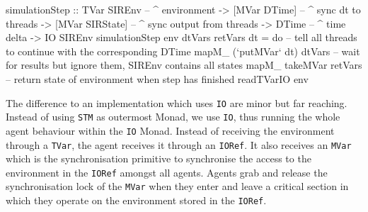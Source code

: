 \begin{HaskellCode}
simulationStep :: TVar SIREnv     -- ^ environment 
               -> [MVar DTime]    -- ^ sync dt to threads
               -> [MVar SIRState] -- ^ sync output from threads
               -> DTime           -- ^ time delta
               -> IO SIREnv
simulationStep env dtVars retVars dt = do
  -- tell all threads to continue with the corresponding DTime
  mapM_ (`putMVar` dt) dtVars
  -- wait for results but ignore them, SIREnv contains all states
  mapM_ takeMVar retVars
  -- return state of environment when step has finished
  readTVarIO env
\end{HaskellCode}

The difference to an implementation which uses \texttt{IO} are minor but far reaching. Instead of using \texttt{STM} as outermost Monad, we use \texttt{IO}, thus running the whole agent behaviour within the \texttt{IO} Monad. Instead of receiving the environment through a \texttt{TVar}, the agent receives it through an \texttt{IORef}. It also receives an \texttt{MVar} which is the synchronisation primitive to synchronise the access to the environment in the \texttt{IORef} amongst all agents. Agents grab and release the synchronisation lock of the \texttt{MVar} when they enter and leave a critical section in which they operate on the environment stored in the \texttt{IORef}.